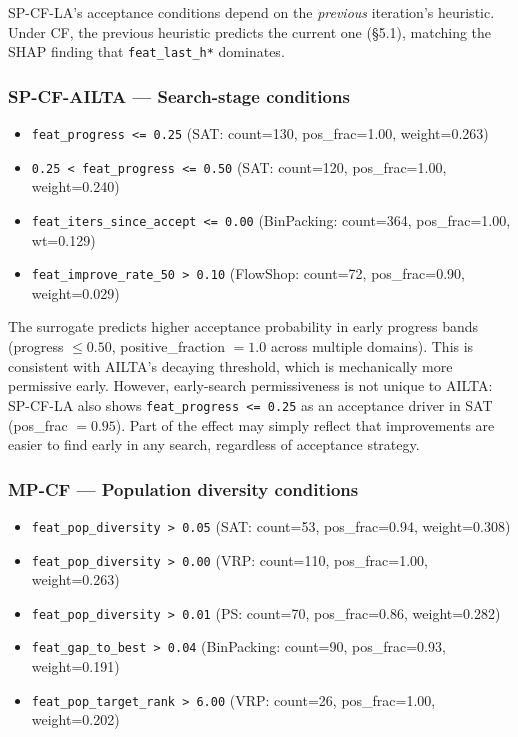 \documentclass[11pt,a4paper]{article}
\begin{document}
SP-CF-LA's acceptance conditions depend on the \emph{previous} iteration's
heuristic. Under CF, the previous heuristic predicts the current one
(\S5.1), matching the SHAP finding that \texttt{feat\_last\_h*} dominates.

\subsubsection*{SP-CF-AILTA --- Search-stage conditions}

\begin{itemize}[nosep]
  \item \texttt{feat\_progress <= 0.25} (SAT: count=130, pos\_frac=1.00, weight=0.263)
  \item \texttt{0.25 < feat\_progress <= 0.50} (SAT: count=120, pos\_frac=1.00, weight=0.240)
  \item \texttt{feat\_iters\_since\_accept\,<=\,0.00}
    (BinPacking: count=364, pos\_frac=1.00, wt=0.129)
  \item \texttt{feat\_improve\_rate\_50 > 0.10} (FlowShop: count=72, pos\_frac=0.90, weight=0.029)
\end{itemize}

The surrogate predicts higher acceptance probability in early progress bands
(progress $\leq 0.50$, positive\_fraction $= 1.0$ across multiple domains).
This is consistent with AILTA's decaying threshold, which is mechanically more
permissive early. However, early-search permissiveness is not unique to AILTA:
SP-CF-LA also shows \texttt{feat\_progress <= 0.25} as an acceptance driver in SAT
(pos\_frac $= 0.95$). Part of the effect may simply reflect that improvements are
easier to find early in any search, regardless of acceptance strategy.

\subsubsection*{MP-CF --- Population diversity conditions}

\begin{itemize}[nosep]
  \item \texttt{feat\_pop\_diversity > 0.05} (SAT: count=53, pos\_frac=0.94, weight=0.308)
  \item \texttt{feat\_pop\_diversity > 0.00} (VRP: count=110, pos\_frac=1.00, weight=0.263)
  \item \texttt{feat\_pop\_diversity > 0.01} (PS: count=70, pos\_frac=0.86, weight=0.282)
  \item \texttt{feat\_gap\_to\_best > 0.04} (BinPacking: count=90, pos\_frac=0.93, weight=0.191)
  \item \texttt{feat\_pop\_target\_rank > 6.00} (VRP: count=26, pos\_frac=1.00, weight=0.202)
\end{itemize}
\end{document}

